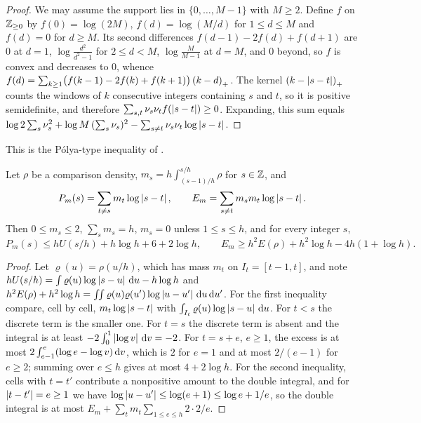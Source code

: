 \begin{proof}
We may assume the support lies in $\{0,\dots,M-1\}$ with $M\ge2$. Define $f$ on $\mathbb{Z}_{\ge0}$ by
$f(0)=\log(2M)$, $f(d)=\log(M/d)$ for $1\le d\le M$ and $f(d)=0$ for $d\ge M$. Its second
differences $f(d-1)-2f(d)+f(d+1)$ are $0$ at $d=1$, $\log\frac{d^2}{d^2-1}$ for $2\le d<M$,
$\log\frac M{M-1}$ at $d=M$, and $0$ beyond, so $f$ is convex and decreases to $0$, whence
$f(d)=\sum_{k\ge1}\bigl(f(k-1)-2f(k)+f(k+1)\bigr)\left(k-d\right)_{+}$. The kernel
$\left(k-\left\lvert s-t\right\rvert\right)_{+}$ counts the windows of $k$ consecutive integers containing $s$ and $t$, so it is
positive semidefinite, and therefore $\sum_{s,t}\nu_s\nu_tf(\left\lvert s-t\right\rvert)\ge0$. Expanding,
this sum equals $\log2\sum_s\nu_s^2+\log M\,(\sum_s\nu_s)^2-\sum_{s\ne t}\nu_s\nu_t\log\left\lvert s-t\right\rvert$.
\end{proof}

This is the Pólya-type inequality of \cite[Lemma~6.4]{Krisman2026chi2}.

\begin{lemma}[discretisation]\label{lem:discretisation}
Let $\rho$ be a comparison density, $m_s=h\int_{(s-1)/h}^{s/h}\rho$ for $s\in\mathbb{Z}$, and
\[
  P_m(s)=\sum_{t\ne s}m_t\log\left\lvert s-t\right\rvert,\qquad E_m=\sum_{s\ne t}m_sm_t\log\left\lvert s-t\right\rvert.
\]
Then $0\le m_s\le2$, $\sum_sm_s=h$, $m_s=0$ unless $1\le s\le h$, and for every integer $s$,
\[
  P_m(s)\le hU(s/h)+h\log h+6+2\log h,\qquad E_m\ge h^2E(\rho)+h^2\log h-4h(1+\log h).
\]
\end{lemma}

\begin{proof}
Let $\varrho(u)=\rho(u/h)$, which has mass $m_t$ on $I_t=[t-1,t]$, and note
$hU(s/h)=\int\varrho(u)\log\left\lvert s-u\right\rvert\,\mathrm{d} u-h\log h$ and
$h^2E(\rho)+h^2\log h=\iint\varrho(u)\varrho(u')\log\left\lvert u-u'\right\rvert\,\mathrm{d} u\,\mathrm{d} u'$. For the first
inequality compare, cell by cell, $m_t\log\left\lvert s-t\right\rvert$ with $\int_{I_t}\varrho(u)\log\left\lvert s-u\right\rvert\,\mathrm{d}
u$. For $t<s$ the discrete term is the smaller one. For $t=s$ the discrete term is absent and
the integral is at least $-2\int_0^1\left\lvert \log v\right\rvert\,\mathrm{d} v=-2$. For $t=s+e$, $e\ge1$, the excess is at
most $2\int_{e-1}^{e}(\log e-\log v)\,\mathrm{d} v$, which is $2$ for $e=1$ and at most $2/(e-1)$ for
$e\ge2$; summing over $e\le h$ gives at most $4+2\log h$. For the second inequality, cells with
$t=t'$ contribute a nonpositive amount to the double integral, and for $\left\lvert t-t'\right\rvert=e\ge1$ we
have $\log\left\lvert u-u'\right\rvert\le\log(e+1)\le\log e+1/e$, so the double integral is at most
$E_m+\sum_tm_t\sum_{1\le e\le h}2\cdot2/e$.
\end{proof}

